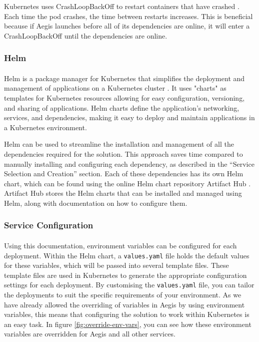 \documentclass[12pt, conference, final, a4paper, onecolumn, compsoc]{IEEEtran}
\begin{document}
Kubernetes uses CrashLoopBackOff to restart containers that have crashed \citep{k8s-docs}. Each
time the pod crashes, the time between restarts increases. This is beneficial
because if Aegis launches before all of its dependencies are online, it will
enter a CrashLoopBackOff until the dependencies are online.

\subsubsection*{Helm}
\paragraph{}
Helm is a package manager for Kubernetes that simplifies the deployment and
management of applications on a Kubernetes cluster \citep{helm}. It uses
"charts" as templates for Kubernetes resources allowing for easy configuration,
versioning, and sharing of applications. Helm charts define the application's
networking, services, and dependencies, making it easy to deploy and maintain
applications in a Kubernetes environment.

Helm can be used to streamline the installation and management of all the
dependencies required for the solution. This approach saves time compared to
manually installing and configuring each dependency, as described in the
``Service Selection and Creation'' section. Each of these dependencies has its
own Helm chart, which can be found using the online Helm chart repository
Artifact Hub \citep{artifact-hub}. Artifact Hub stores the Helm charts that can
be installed and managed using Helm, along with documentation on how to
configure them.

\subsubsection*{Service Configuration}
\paragraph{}

Using this documentation, environment variables can be configured for each
deployment. Within the Helm chart, a \texttt{values.yaml} file holds the default
values for these variables, which will be passed into several template files.
These template files are used in Kubernetes to generate the appropriate
configuration settings for each deployment. By customising the
\texttt{values.yaml} file, you can tailor the deployments to suit the specific
requirements of your environment. As we have already allowed the overriding of
variables in Aegis by using environment variables, this means that configuring
the solution to work within Kubernetes is an easy task. In figure
\ref{fig:override-env-vars}, you can see how these environment variables are
overridden for Aegis and all other services.
\end{document}
